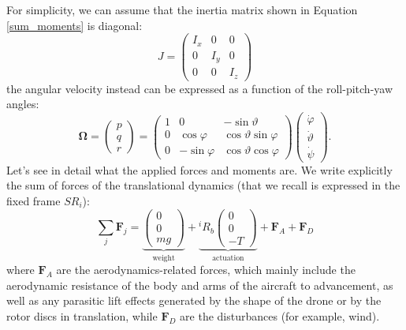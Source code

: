 \documentclass[10pt, a4paper]{report}
\begin{document}
\noindent For simplicity, we can assume that the inertia matrix shown in Equation \eqref{sum_moments} is diagonal:\begin{equation}
    J=\begin{pmatrix}
        I_x&0&0\\
        0&I_y&0\\
        0&0&I_z
    \end{pmatrix}
\end{equation}
the angular velocity instead can be expressed as a function of the roll-pitch-yaw angles:\begin{equation}
    \boldsymbol{\Omega}=\begin{pmatrix}
        p\\ q\\ r
    \end{pmatrix}=\begin{pmatrix}
        1&0&-\sin\vartheta\\ 
        0&\cos\varphi&\cos\vartheta\sin\varphi\\ 
        0&-\sin\varphi&\cos\vartheta\cos\varphi
    \end{pmatrix}\begin{pmatrix}
        \dot\varphi\\ \dot\vartheta\\ \dot\psi
    \end{pmatrix}.
\end{equation}
Let's see in detail what the applied forces and moments are. We write explicitly the sum of forces of the translational dynamics (that we recall is expressed in the fixed frame $SR_i$):\begin{equation}
    \sum_j \mathbf F_j=\underbrace{\begin{pmatrix}
        0\\0\\mg
    \end{pmatrix}}_{\text{weight}}
    +
    \underbrace{{}^iR_b\begin{pmatrix}
        0\\0\\-T
    \end{pmatrix}}_{\text{actuation}} + \mathbf F_A+\mathbf F_D
\end{equation}
where $\mathbf F_A$ are the aerodynamics-related forces, which mainly include the aerodynamic resistance of the body and arms of the aircraft to advancement, as well as any parasitic lift effects generated by the shape of the drone or by the rotor discs in translation, while $\mathbf F_D$ are the disturbances (for example, wind).
\end{document}

